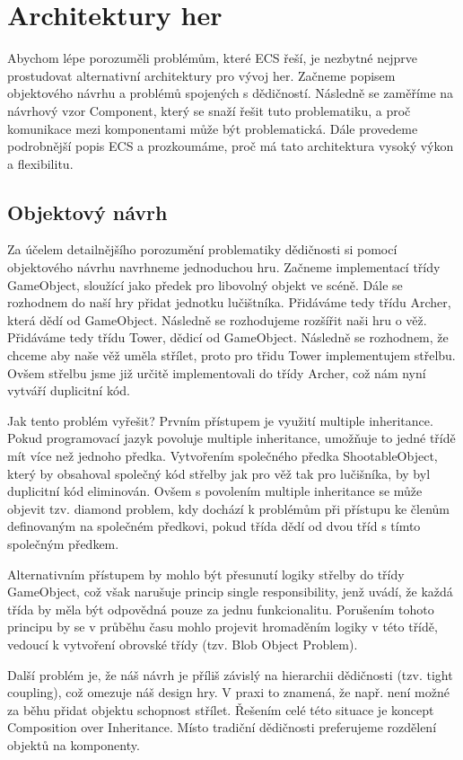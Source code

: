 \chapter{Architektury her}
Abychom lépe porozuměli problémům, které ECS řeší, je nezbytné nejprve prostudovat alternativní architektury pro vývoj her. Začneme popisem objektového návrhu a problémů spojených s dědičností. Následně se zaměříme na návrhový vzor Component, který se snaží řešit tuto problematiku, a proč komunikace mezi komponentami může být problematická. Dále provedeme podrobnější popis ECS a prozkoumáme, proč má tato architektura vysoký výkon a flexibilitu.

\section{Objektový návrh}
Za účelem detailnějšího porozumění problematiky dědičnosti si pomocí objektového návrhu navrhneme jednoduchou hru. Začneme implementací třídy GameObject, sloužící jako předek pro libovolný objekt ve scéně. Dále se rozhodnem do naší hry přidat jednotku lučištníka. Přidáváme tedy třídu Archer, která dědí od GameObject. Následně se rozhodujeme rozšířit naši hru o věž. Přidáváme tedy třídu Tower, dědicí od GameObject. Následně se rozhodnem, že chceme aby naše věž uměla střílet, proto pro třidu Tower implementujem střelbu. Ovšem střelbu jsme již určitě implementovali do třídy Archer, což nám nyní vytváří duplicitní kód.

Jak tento problém vyřešit? Prvním přístupem je využití multiple inheritance. Pokud programovací jazyk povoluje multiple inheritance, umožňuje to jedné třídě mít více než jednoho předka. Vytvořením společného předka ShootableObject, který by obsahoval společný kód střelby jak pro věž tak pro lučišníka, by byl duplicitní kód eliminován. Ovšem s povolením multiple inheritance se může objevit tzv. diamond problem, kdy dochází k problémům při přístupu ke členům definovaným na společném předkovi, pokud třída dědí od dvou tříd s tímto společným předkem.

Alternativním přístupem by mohlo být přesunutí logiky střelby do třídy GameObject, což však narušuje princip single responsibility, jenž uvádí, že každá třída by měla být odpovědná pouze za jednu funkcionalitu. Porušením tohoto principu by se v průběhu času mohlo projevit hromaděním logiky v této třídě, vedoucí k vytvoření obrovské třídy (tzv. Blob Object Problem).

Další problém je, že náš návrh je příliš závislý na hierarchii dědičnosti (tzv. tight coupling), což omezuje náš design hry. V praxi to znamená, že např. není možné za běhu přidat objektu schopnost střílet. Řešením celé této situace je koncept Composition over Inheritance. Místo tradiční dědičnosti preferujeme rozdělení objektů na komponenty.

